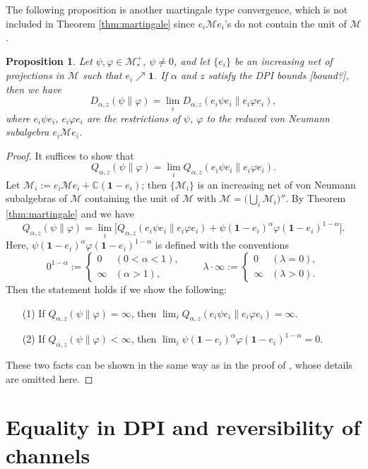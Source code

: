 \documentclass[12pt]{article}
\newtheorem{prop}[theorem]{Proposition}
\theoremstyle{definition}
\theoremstyle{remark}
\numberwithin{equation}{section}
\def\Me{\mathcal M}
\def\ffi{\varphi}
\def\1{\mathbf{1}}
\def\bC{\mathbb{C}}
\begin{document}
{
The following proposition is another martingale type convergence, which is not included in
Theorem \ref{thm:martingale} since $e_i\Me e_i$'s do not contain the unit of $\Me$.

\begin{prop}
Let $\psi,\varphi\in \Me_*^+$, $\psi\ne 0$, and let $\{e_i\}$ be an increasing net of projections in $\Me$
such that $e_i\nearrow\1$. If $\alpha$ and $z$ satisfy the DPI bounds [bound?], then we have
\[
D_{\alpha,z}(\psi\|\ffi)=\lim_iD_{\alpha,z}(e_i\psi e_i\|e_i\ffi e_i),
\]
where $e_i\psi e_i$, $e_i\ffi e_i$ are the restrictions of $\psi$, $\ffi$ to the reduced von Neumann
subalgebra $e_i\Me e_i$.
\end{prop}

\begin{proof}
It suffices to show that
\[
Q_{\alpha,z}(\psi\|\ffi)=\lim_iQ_{\alpha,z}(e_i\psi e_i\|e_i\ffi e_i).
\]
Let $\Me_i:=e_i\Me e_i+\bC(\1-e_i)$; then $\{\Me_i\}$ is an increasing net of von Neumann subalgebras
of $\Me$ containing the unit of $\Me$ with $\Me=\bigl(\bigcup_i\Me_i\bigr)''$. By
Theorem \ref{thm:martingale} and \cite[Theorems 1(ii) and 2(ii)]{kato2023onrenyi} we have
\[
Q_{\alpha,z}(\psi\|\ffi)
=\lim_i\bigl[Q_{\alpha,z}(e_i\psi e_i\|e_i\ffi e_i)+\psi(\1-e_i)^\alpha\ffi(\1-e_i)^{1-\alpha}\bigr].
\]
Here, $\psi(\1-e_i)^\alpha\ffi(\1-e_i)^{1-\alpha}$ is defined with the conventions
\[
0^{1-\alpha}:=\begin{cases}0 & (0<\alpha<1), \\ \infty & (\alpha>1),\end{cases}\qquad
\lambda\cdot\infty:=\begin{cases}0 & (\lambda=0), \\ \infty & (\lambda>0).\end{cases}
\]
Then the statement holds if we show the following:
\begin{itemize}
\item[(1)] If $Q_{\alpha,z}(\psi\|\ffi)=\infty$, then $\lim_iQ_{\alpha,z}(e_i\psi e_i\|e_i\ffi e_i)=\infty$.
\item[(2)] If $Q_{\alpha,z}(\psi\|\ffi)<\infty$, then $\lim_i\psi(\1-e_i)^\alpha\ffi(\1-e_i)^{1-\alpha}=0$.
\end{itemize}
These two facts can be shown in the same way as in the proof of \cite[Theorem 4.5]{hiai2018quantum},
whose details are omitted here.
\end{proof}}


\section{Equality in DPI and reversibility of channels}
\end{document}
